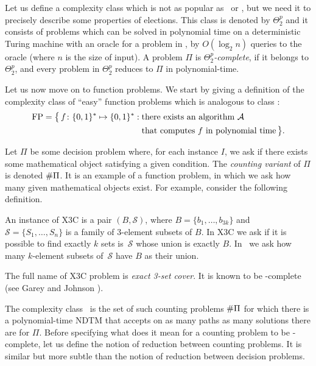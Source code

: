 Let us define a complexity class which is not as popular as \Pclass\ or \NPclass, but we need it to precisely describe some properties of elections.
This class is denoted by $\Theta_2^p$ and it consists of problems which can be solved in polynomial time on a deterministic Turing machine with an oracle for a problem in \NPclass, by $O(\log_2n)$ queries to the oracle (where $n$ is the size of input).
A problem $\Pi$ is \emph{$\Theta_2^p$-complete}, if it belongs to $\Theta_2^p$, and every problem in $\Theta_2^p$ reduces to $\Pi$ in polynomial-time.

Let us now move on to function problems.
We start by giving a definition of the complexity class of ``easy'' function problems which is analogous to class \Pclass:
\begin{align*}
    \textnormal{FP} = \bigl\{\,f\colon\{0,1\}^*\mapsto\{0,1\}^*:\;&\text{there exists an algorithm $\mathcal{A}$} \\
	& \text{that computes $f$ in polynomial time}\,\bigr\}.
\end{align*}

Let $\Pi$ be some decision problem where, for each instance $I$, we ask if there exists some mathematical object satisfying a given condition.
The \emph{counting variant} of $\Pi$ is denoted $\textnormal{\#}\Pi$.
It is an example of a function problem, in which we ask how many given mathematical objects exist.
For example, consider the following definition.

\begin{definition} \label{def:sharpXthreeC}
    An instance of \textnormal{X3C} is a pair $(B,\mathcal{S})$, where $B=\{b_1,\dots,b_{3k}\}$ and \,$\mathcal{S}=\{S_1,\dots,S_n\}$ is a family of 3-element subsets of $B$.
	In \textnormal{X3C} we ask if it is possible to find exactly $k$ sets is \,$\mathcal{S}$ whose union is exactly $B$.
	In \sharpXthreeC\ we ask how many $k$-element subsets of \,$\mathcal{S}$ have $B$ as their union.
\end{definition}

The full name of X3C problem is \emph{exact 3-set cover}.
It is known to be \NPclass-complete (see Garey and Johnson \cite{garey}).

The complexity class \sharpPclass\ is the set of such counting problems $\textnormal{\#}\Pi$ for which there is a polynomial-time NDTM that accepts on as many paths as many solutions there are for $\Pi$.
Before specifying what does it mean for a counting problem to be \sharpPclass-complete, let us define the notion of reduction between counting problems.
It is similar but more subtle than the notion of reduction between decision problems.

